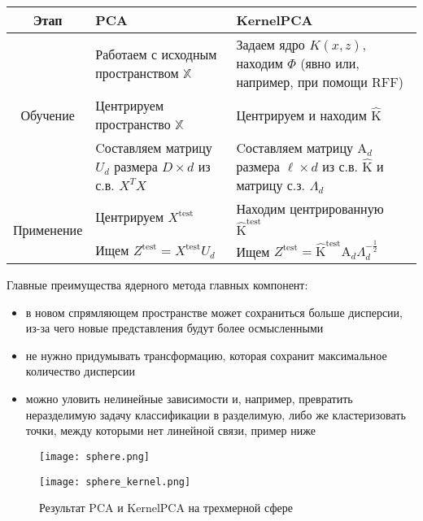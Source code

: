 \documentclass[12pt,fleqn]{article}
\begin{document}
\begin{center}
\begin{tabularx}{\linewidth}{|c|X|X|} 
  \hline
 \textbf{Этап} & \textbf{PCA} & \textbf{KernelPCA} \\ 
 \hline
 \multirow{3}{*}{Обучение}
 &
 Работаем с исходным пространством $\mathbb{X}$
 &
 Задаем ядро $K(x, z)$, находим $\Phi$ (явно или, например, при помощи RFF)
 \\ 
 \cline{2-3}
 & 
 Центрируем пространство $\mathbb{X}$
 & 
 Центрируем и находим $\hat{\text{K}}$
 \\
 \cline{2-3}
 &
 Cоставляем матрицу $U_d$ размера $D \times d$ из с.в. $X^TX$
  &
 Cоставляем матрицу $\text{A}_d$ размера $\ell \times d$ из с.в. $\hat{\text{K}}$ и матрицу с.з. $\Lambda_d$
 \\
 \hline
  \multirow{2}{*}{Применение}
  &
  Центрируем $X^{\text{test}}$
  &
  Находим центрированную $\hat{\text{K}}^{\text{test}}$
  \\
\cline{2-3}
 &
 Ищем $Z^{\text{test}} = X^{\text{test}}U_d$ 
 &
 Ищем $Z^{\text{test}} = \hat{\text{K}}^{\text{test}}\text{A}_d\Lambda_d^{-\frac{1}{2}}$
 \\
\hline
\end{tabularx}
\end{center}

Главные преимущества ядерного метода главных компонент:
\begin{itemize}
    \item в новом спрямляющем пространстве может сохраниться больше дисперсии, из-за чего новые представления будут более осмысленными
    \item не нужно придумывать трансформацию, которая сохранит максимальное количество дисперсии
    \item можно уловить нелинейные зависимости и, например, превратить неразделимую задачу классификации в разделимую, либо же кластеризовать точки, между которыми нет линейной связи, пример ниже
\end{itemize}

\begin{figure}[h|t]
\centering
\begin{minipage}{0.36\textwidth}
  \centering
  \texttt{[image: sphere.png]}
  \label{fig:sub1}
\end{minipage}%
\begin{minipage}{0.36\textwidth}
  \centering
  \texttt{[image: sphere\_kernel.png]}
  \label{fig:sub2}
\end{minipage}
\caption{Результат PCA и KernelPCA на трехмерной сфере}
\label{fig:test}
\end{figure}
\end{document}
